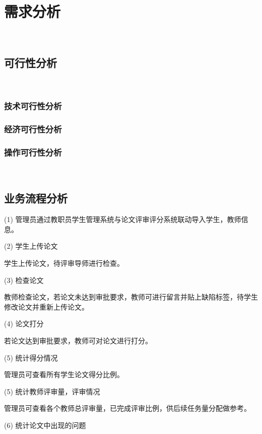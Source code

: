 
\chapter{需求分析}
\label{chap07}
~\\
\section{可行性分析}
~\\
\subsection{技术可行性分析}
\subsection{经济可行性分析}
\subsection{操作可行性分析}
~\\
\section{业务流程分析}

 (1) 管理员通过教职员学生管理系统与论文评审评分系统联动导入学生，教师信息。

(2) 学生上传论文

学生上传论文，待评审导师进行检查。

(3) 检查论文

教师检查论文，若论文未达到审批要求，教师可进行留言并贴上缺陷标签，待学生修改论文并重新上传论文。

(4) 论文打分

若论文达到审批要求，教师可对论文进行打分。

(5) 统计得分情况

管理员可查看所有学生论文得分比例。

(5) 统计教师评审量，评审情况

管理员可查看各个教师总评审量，已完成评审比例，供后续任务量分配做参考。

(6) 统计论文中出现的问题

